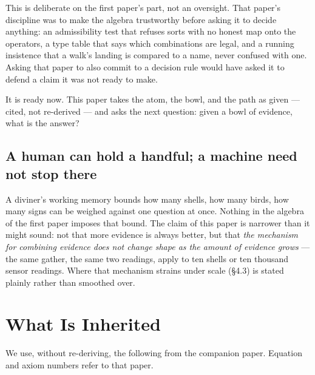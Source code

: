 \documentclass[12pt, a4paper]{article}
\begin{document}
This is deliberate on the first paper's part, not an oversight. That
paper's discipline was to make the algebra trustworthy before asking
it to decide anything: an admissibility test that refuses sorts with
no honest map onto the operators, a type table that says which
combinations are legal, and a running insistence that a walk's landing
is compared to a name, never confused with one. Asking that paper to
also commit to a decision rule would have asked it to defend a claim
it was not ready to make.

It is ready now. This paper takes the atom, the bowl, and the path as
given --- cited, not re-derived --- and asks the next question: given
a bowl of evidence, what is the answer?

\subsection{A human can hold a handful; a machine need not stop
there}
A diviner's working memory bounds how many shells, how many birds, how
many signs can be weighed against one question at once. Nothing in
the algebra of the first paper imposes that bound. The claim of this
paper is narrower than it might sound: not that more evidence is
always better, but that \emph{the mechanism for combining evidence
does not change shape as the amount of evidence grows} --- the same
gather, the same two readings, apply to ten shells or ten thousand
sensor readings. Where that mechanism strains under scale (\S 4.3) is
stated plainly rather than smoothed over.

\section{What Is Inherited}
\label{sec:inherited}

We use, without re-deriving, the following from the companion paper.
Equation and axiom numbers refer to that paper.
\end{document}
